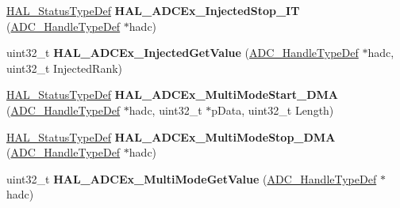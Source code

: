 \begin{DoxyCompactItemize}
\item 
\mbox{\label{group___a_d_c_ex___exported___functions___group1_gae032f41136f4dc4b3f3c2476b96a21f5}} 
\mbox{\hyperlink{stm32f7xx__hal__def_8h_a63c0679d1cb8b8c684fbb0632743478f}{H\+A\+L\+\_\+\+Status\+Type\+Def}} {\bfseries H\+A\+L\+\_\+\+A\+D\+C\+Ex\+\_\+\+Injected\+Stop\+\_\+\+IT} (\mbox{\hyperlink{struct_a_d_c___handle_type_def}{A\+D\+C\+\_\+\+Handle\+Type\+Def}} $\ast$hadc)
\item 
\mbox{\label{group___a_d_c_ex___exported___functions___group1_ga7996668b61263f91c76d5f55551f3a07}} 
uint32\+\_\+t {\bfseries H\+A\+L\+\_\+\+A\+D\+C\+Ex\+\_\+\+Injected\+Get\+Value} (\mbox{\hyperlink{struct_a_d_c___handle_type_def}{A\+D\+C\+\_\+\+Handle\+Type\+Def}} $\ast$hadc, uint32\+\_\+t Injected\+Rank)
\item 
\mbox{\label{group___a_d_c_ex___exported___functions___group1_gab36a3508a06430d7c7d0def79ec61b08}} 
\mbox{\hyperlink{stm32f7xx__hal__def_8h_a63c0679d1cb8b8c684fbb0632743478f}{H\+A\+L\+\_\+\+Status\+Type\+Def}} {\bfseries H\+A\+L\+\_\+\+A\+D\+C\+Ex\+\_\+\+Multi\+Mode\+Start\+\_\+\+D\+MA} (\mbox{\hyperlink{struct_a_d_c___handle_type_def}{A\+D\+C\+\_\+\+Handle\+Type\+Def}} $\ast$hadc, uint32\+\_\+t $\ast$p\+Data, uint32\+\_\+t Length)
\item 
\mbox{\label{group___a_d_c_ex___exported___functions___group1_ga6a114ff60985be225d621a5c3be8ddf2}} 
\mbox{\hyperlink{stm32f7xx__hal__def_8h_a63c0679d1cb8b8c684fbb0632743478f}{H\+A\+L\+\_\+\+Status\+Type\+Def}} {\bfseries H\+A\+L\+\_\+\+A\+D\+C\+Ex\+\_\+\+Multi\+Mode\+Stop\+\_\+\+D\+MA} (\mbox{\hyperlink{struct_a_d_c___handle_type_def}{A\+D\+C\+\_\+\+Handle\+Type\+Def}} $\ast$hadc)
\item 
\mbox{\label{group___a_d_c_ex___exported___functions___group1_ga5ab7c06d2f0b5f9de1f86de5713d68d2}} 
uint32\+\_\+t {\bfseries H\+A\+L\+\_\+\+A\+D\+C\+Ex\+\_\+\+Multi\+Mode\+Get\+Value} (\mbox{\hyperlink{struct_a_d_c___handle_type_def}{A\+D\+C\+\_\+\+Handle\+Type\+Def}} $\ast$hadc)
\item 
\mbox{\label{group___a_d_c_ex___exported___functions___group1_gaed7815e8b636ff1c1f456ecbaffe1942}} 

\end{DoxyCompactItemize}

